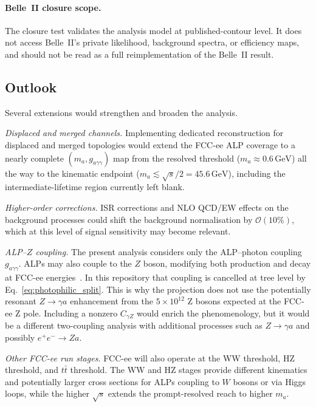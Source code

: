 \documentclass[12pt,a4paper]{article}
\newcommand{\alp}{a}
\newcommand{\gagg}{g_{a\gamma\gamma}}
\newcommand{\ma}{m_a}
\newcommand{\sqrts}{\sqrt{s}}
\newcommand{\GeV}{\,\text{GeV}}
\begin{document}
\paragraph{Belle~II closure scope.}
The closure test validates the analysis model at published-contour level.
It does not access Belle~II's private likelihood, background spectra,
or efficiency maps, and should not be read as a full reimplementation of
the Belle~II result.

\subsection{Outlook}

Several extensions would strengthen and broaden the analysis.

\textit{Displaced and merged channels.}
Implementing dedicated reconstruction for displaced and merged topologies
would extend the FCC-ee ALP coverage to a nearly complete $(m_\alp, \gagg)$
map from the resolved threshold ($\ma \approx 0.6\GeV$) all the way to the
kinematic endpoint ($\ma \lesssim \sqrts/2 = 45.6\GeV$), including
the intermediate-lifetime region currently left blank.

\textit{Higher-order corrections.}
ISR corrections and NLO QCD/EW effects on the background processes could shift
the background normalisation by $\mathcal{O}(10\%)$, which at this level of
signal sensitivity may become relevant.

\textit{ALP--$Z$ coupling.}
The present analysis considers only the ALP--photon coupling $\gagg$.
ALPs may also couple to the $Z$ boson, modifying both production and
decay at FCC-ee energies~\cite{Brivio2017,Dolan2017}.
In this repository that coupling is cancelled at tree level by
Eq.~\eqref{eq:photophilic_split}. This is why the projection does not use the
potentially resonant $Z\to\gamma a$ enhancement from the
$5\times10^{12}$ Z bosons expected at the FCC-ee Z pole. Including a nonzero
$C_{\gamma Z}$ would enrich the phenomenology, but it would be a different
two-coupling analysis with additional processes such as $Z\to\gamma a$ and
possibly $e^+e^-\to Za$.

\textit{Other FCC-ee run stages.}
FCC-ee will also operate at the WW threshold, HZ threshold, and $t\bar{t}$
threshold.
The WW and HZ stages provide different kinematics and potentially larger
cross sections for ALPs coupling to $W$ bosons or via Higgs loops,
while the higher $\sqrts$ extends the prompt-resolved reach to higher $\ma$.

\end{document}
